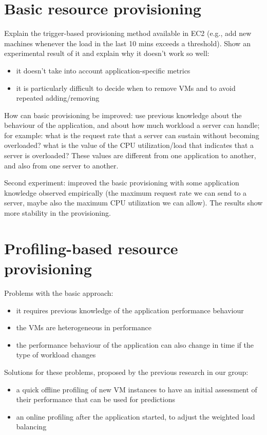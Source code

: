 \documentclass[10pt,twocolumn]{article}
\begin{document}
\section*{Basic resource provisioning}

Explain the trigger-based provisioning method available in EC2 (e.g., add new machines
whenever the load in the last 10 mins exceeds a threshold). Show an experimental result
of it and explain why it doesn't work so well:

\begin{itemize}
\item it doesn't take into account application-specific metrics
\item it is particularly difficult to decide when to remove VMs and to avoid
repeated adding/removing
\end{itemize}

How can basic provisioning be improved: use previous knowledge about the behaviour
of the application, and about how much workload a server can handle; for example:
what is the request rate that a server can sustain without becoming overloaded?
what is the value of the CPU utilization/load that indicates that a server is
overloaded? These values are different from one application to another, and also
from one server to another. 

Second experiment: improved the basic provisioning with some application knowledge
observed empirically (the maximum request rate we can send to a server, maybe also
the maximum CPU utilization we can allow). The results show more stability in the
provisioning.  


\section*{Profiling-based resource provisioning}


Problems with the basic approach:
\begin{itemize}
\item it requires previous knowledge of the application performance behaviour
\item the VMs are heterogeneous in performance
\item the performance behaviour of the application can also change in time
if the type of workload changes
\end{itemize}

Solutions for these problems, proposed by the previous research in our group:
\begin{itemize}
\item a quick offline profiling of new VM instances to have an initial assessment
of their performance that can be used for predictions
\item an online profiling after the application started, to adjust the weighted
load balancing
\end{itemize}
\end{document}
